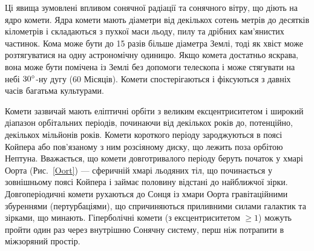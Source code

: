 \documentclass[a4paper]{article}
\begin{document}
    Ці явища зумовлені впливом сонячної радіації та сонячного вітру, що діють на ядро комети. Ядра комети мають діаметри від декількох сотень метрів до десятків кілометрів і складаються з пухкої маси льоду, пилу та дрібних кам'янистих частинок. Кома може бути до 15 разів більше діаметра Землі, тоді як хвіст може розтягуватися на одну астрономічну одиницю. Якщо комета достатньо яскрава, вона може бути помічена із Землі без допомоги телескопа і може стягувати на небі $30\degree$-ну дугу (60 Місяців)\cite{9}. Комети спостерігаються і фіксуються з давніх часів багатьма культурами.

    Комети зазвичай мають еліптичні орбіти з великим ексцентриситетом і широкий діапазон орбітальних періодів, починаючи від декількох років до, потенційно, декількох мільйонів років. Комети короткого періоду зароджуються в поясі Койпера або пов'язаному з ним розсіяному диску\cite{10}, що лежить поза орбітою Нептуна. Вважається, що комети довготривалого періоду беруть початок у хмарі Оорта\cite{11} (Рис.~\ref{Oort}) --- сферичній хмарі льодяних тіл, що починається у зовнішньому поясі Койпера і займає половину відстані до найближчої зірки. Довгоперіодичні комети рухаються до Сонця із хмари Оорта гравітаційними збуреннями (пертурбаціями), що спричиняються приливними силами галактик та зірками, що минають. Гіперболічні комети (з ексцентриситетом $\geq 1$) можуть пройти один раз через внутрішню Сонячну систему, перш ніж потрапити в міжзоряний простір.
    
\end{document}
